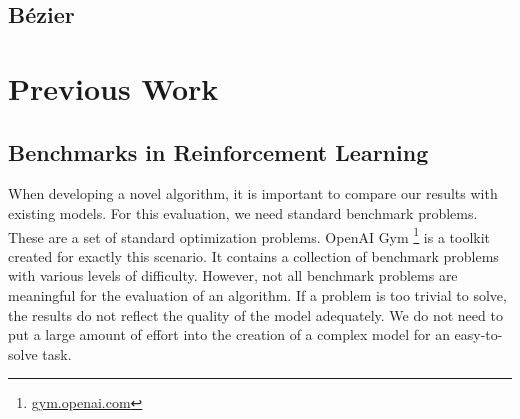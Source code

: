 \subsection{Bézier}


\section{Previous Work}

\subsection{Benchmarks in Reinforcement Learning}
\label{ssec:benchmarks}
When developing a novel algorithm, it is important to compare our results with existing models. For this evaluation, we need standard benchmark problems. These are a set of standard optimization problems. OpenAI Gym \footnote{\url{gym.openai.com}} is a toolkit created for exactly this scenario. It contains a collection of benchmark problems with various levels of difficulty. However, not all benchmark problems are meaningful for the evaluation of an algorithm. If a problem is too trivial to solve, the results do not reflect the quality of the model adequately. We do not need to put a large amount of effort into the creation of a complex model for an easy-to-solve task.

